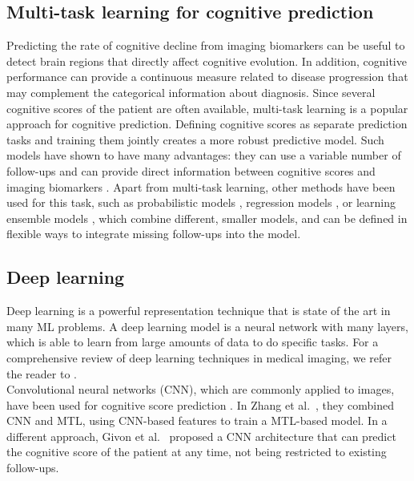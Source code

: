 \subsection{Multi-task learning for cognitive prediction}

Predicting the rate of cognitive decline from imaging biomarkers can be useful to detect brain regions that directly affect cognitive evolution. In addition, cognitive performance can provide a continuous measure related to disease progression that may complement the categorical information about diagnosis. Since several cognitive scores of the patient are often available, multi-task learning is a popular approach for cognitive prediction. Defining cognitive scores as separate prediction tasks and training them jointly creates a more robust predictive model. Such models have shown to have many advantages: they can use a variable number of follow-ups \cite{Lei2017,Zhou2013a,Aksman2019} and can provide direct information between cognitive scores and imaging biomarkers \cite{Jie2017,Lei2017,Wang2012b,Wang2016,Zhang2012a}. Apart from multi-task learning, other methods have been used for this task, such as probabilistic models \cite{Zhu2018}, regression models \cite{AraqueCaballero2017}, or learning ensemble models \cite{Chi2017,Huang2016c,Yang2018a}, which combine different, smaller models, and can be defined in flexible ways to integrate missing follow-ups into the model. \\

\subsection{Deep learning}

Deep learning is a powerful representation technique that is state of the art in many ML problems. A deep learning model is a neural network with many layers, which is able to learn from large amounts of data to do specific tasks. For a comprehensive review of deep learning techniques in medical imaging, we refer the reader to \cite{Litjens2017}. \\

Convolutional neural networks (CNN), which are commonly applied to images, have been used for cognitive score prediction \cite{Givon2017,Zhang2017}. In Zhang et al.\ \cite{Zhang2017}, they combined CNN and MTL, using CNN-based features to train a MTL-based model. In a different approach, Givon et al.\ \cite{Givon2017} proposed a CNN architecture that can predict the cognitive score of the patient at any time, not being restricted to existing follow-ups. \\

